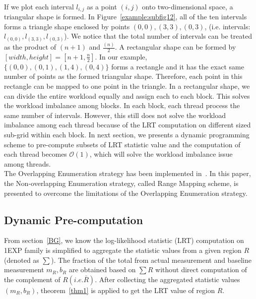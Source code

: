 \documentclass[AMA,LATO1COL]{WileyNJD-v2-bak}
\newcommand\bigo{\mathcal O}
\begin{document}
\\If we plot each interval $l_{i,j}$ as a point $(i,j)$ onto two-dimensional space, a triangular shape is formed. In Figure~\ref{example:subfig12}, all of the ten intervals forms a triangle shape enclosed by points ${(0,0),(3,3),(0,3)}$, (i.e. intervals: ${l_{(0,0)},l_{(3,3)},l_{(0,3)}}$). We notice that the total number of intervals can be treated as the product of $(n+1)$ and ${\frac{(n)}{2}}$. A rectangular shape can be formed by $[width,height]=[n+1,{\frac{n}{2}}]$. In our example, $\{{(0,0)},{(0,1)},{(1,4)},{(0,4)}\}$ forms a rectangle and it has the exact same number of points as the formed triangular shape. Therefore, each point in this rectangle can be mapped to one point in the triangle. In a rectangular shape, we can divide the entire workload equally and assign each to each block. This solves the workload imbalance among blocks. In each block, each thread process the same number of intervals. However, this still does not solve the workload imbalance among each thread because of the LRT computation on different sized sub-grid within each block. In next section, we presents a dynamic programming scheme to pre-compute subsets of LRT statistic value and the computation of each thread becomes $\bigo(1)$, which will solve the workload imbalance issue among threads. \\
The Overlapping Enumeration strategy has been implemented in~\cite{apweb}. In this paper, the Non-overlapping Enumeration strategy, called Range Mapping scheme, is presented to overcome the limitations of the Overlapping Enumeration strategy.

\subsection{Dynamic Pre-computation}
\label{sec:mov2}
From section~\ref{BG}, we know the log-likelihood statistic (LRT) computation on 1EXP family is simplified to aggregate the statistic values from a given region $R$ (denoted as $\sum $). The fraction of the total from actual measurement and baseline measurement $m_R,b_R$ are obtained based on $\sum R$ without direct computation of the complement of $R (i.e. \bar R)$. After collecting the aggregated statistic values $(m_R,b_R)$, theorem~\ref{thm1} is applied to get the LRT value of region $R$.
\end{document}
